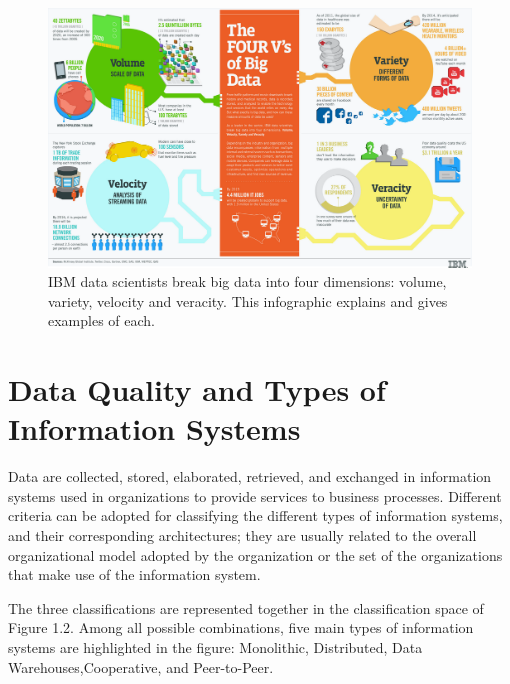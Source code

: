 \begin{figure}[H]
    \centering
    \includegraphics[angle=-90,scale=.3]{4-Vs-of-big-data}
    \caption{IBM data scientists break big data into four dimensions: volume, variety, velocity and veracity. This infographic explains and gives examples of each. ~\cite{ibmInfoGraphic}}
\end{figure}

\section{Data Quality and Types of Information Systems}

Data are collected, stored, elaborated, retrieved, and exchanged in information systems used in organizations to provide services to business processes.
Different criteria can be adopted for classifying the different types of information systems, and their corresponding architectures; they are usually related to
the overall organizational model adopted by the organization or the set of the
organizations that make use of the information system.

The three classifications are represented together in the classification space of Figure 1.2.
Among all possible combinations, five main types of information systems are highlighted in the figure:
Monolithic, Distributed, Data Warehouses,Cooperative, and Peer-to-Peer.


